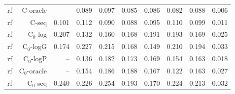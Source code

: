 \begin{table}[htbp]
\begin{tabular}{lrrrrrrrrr}
rf & C-oracle & -- & 0.089 & 0.097 & 0.085 & 0.086 & 0.082 & 0.088 & 0.006 \\
rf & C-seq & 0.101 & 0.112 & 0.090 & 0.088 & 0.095 & 0.110 & 0.099 & 0.011 \\
rf & C$_0$-log & 0.207 & 0.132 & 0.160 & 0.168 & 0.191 & 0.193 & 0.169 & 0.025 \\
rf & C$_0$-logG & 0.174 & 0.227 & 0.215 & 0.168 & 0.149 & 0.210 & 0.194 & 0.033 \\
rf & C$_0$-logP & -- & 0.136 & 0.182 & 0.173 & 0.169 & 0.154 & 0.163 & 0.018 \\
rf & C$_0$-oracle & -- & 0.154 & 0.186 & 0.188 & 0.167 & 0.122 & 0.163 & 0.027 \\
rf & C$_0$-seq & 0.240 & 0.226 & 0.254 & 0.193 & 0.170 & 0.224 & 0.213 & 0.032 \\
\bottomrule
\end{tabular}
\end{table}
